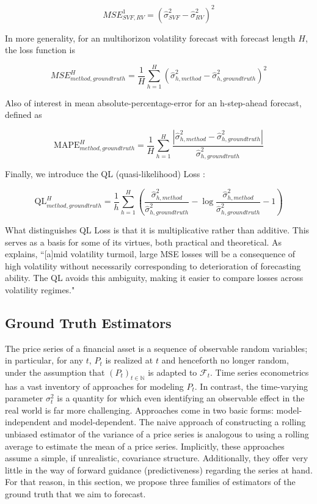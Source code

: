 \documentclass[11pt]{article}
\def\mc#1{\mathcal{#1}} %
\def\mc#1{\mathcal{#1}}
\theoremstyle{definition}
\begin{document}
$$ MSE^{1}_{SVF, RV} = (\hat\sigma^{2}_{SVF} - \hat\sigma^{2}_{RV})^{2}$$

In more generality, for an multihorizon volatility forecast with forecast length $H$, the loss function is 

$$ MSE^{H}_{method, ground truth} = \frac{1}{H}\sum_{h=1}^{H}(\hat\sigma^{2}_{h, method} - \hat\sigma^{2}_{h, ground truth})^{2}$$

Also of interest in mean absolute-percentage-error for an h-step-ahead forecast, defined as

\[ 
\text{MAPE}^{H}_{method, ground truth} = \frac{1}{H}\sum_{h=1}^{H}\frac{|\hat\sigma^{2}_{h, method} - \hat\sigma^{2}_{h, ground truth}|}{\hat\sigma^{2}_{h, ground truth}}
\]

Finally, we introduce the QL (quasi-likelihood) Loss \citep{brownlees2011practical}:

\[ 
\text{QL}^{H}_{method, ground truth} = \frac{1}{h}\sum_{h=1}^{H} (\frac{ \hat\sigma^{2}_{h, method} }{\hat\sigma^{2}_{h, ground truth}} - \log{\frac{ \hat\sigma^{2}_{h, method} }{\hat\sigma^{2}_{h, ground truth}}} -1)
\]

What distinguishes QL Loss is that it is multiplicative rather than additive.  This serves as a basis for some of its virtues, both practical and theoretical.  As \citet{brownlees2011practical} explains, ``[a]mid volatility turmoil, large MSE
losses will be a consequence of high volatility without necessarily corresponding to
deterioration of forecasting ability. The QL avoids this ambiguity, making it easier to
compare losses across volatility regimes."


\subsection{Ground Truth Estimators}
\label{Ground Truth Estimators}

The price series of a financial asset is a sequence of observable random variables; in particular, for any $t$, $P_{t}$ is realized at $t$ and henceforth no longer random, under the assumption that $(P_{t})_{t\in\mathbb{N}}$ is adapted to $\mc{F}_{t}$.  Time series econometrics has a vast inventory of approaches for modeling $P_{t}$.  In contrast, the time-varying parameter $\sigma^{2}_{t}$ is a quantity for which even identifying an observable effect in the real world is far more challenging.  Approaches come in two basic forms: model-independent and model-dependent.  The naive approach of constructing a rolling unbiased estimator of the variance of a price series is analogous to using a rolling average to estimate the mean of a price series.  Implicitly, these approaches assume a simple, if unrealistic, covariance structure.  Additionally, they offer very little in the way of forward guidance (predictiveness) regarding the series at hand.  For that reason, in this section, we propose three families of estimators of the ground truth that we aim to forecast.
\end{document}
